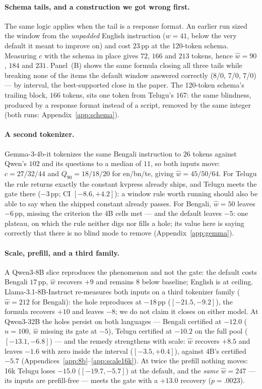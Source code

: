 \documentclass{article}
\begin{document}
\paragraph{Schema tails, and a construction we got wrong first.}
The same logic applies when the tail is a response format. An
earlier run sized the window from the \emph{unpadded} English
instruction ($w{=}41$, below the very default it meant to improve on)
and cost $23$\,pp at the 120-token schema. Measuring $c$ with the
schema in place gives $72$, $166$ and $213$ tokens, hence
$\hat w = 90$, $184$ and $231$. Panel~(B) shows the same formula closing
all three tails while breaking none of the items the default window
answered correctly (8/0, 7/0, 7/0) --- by interval, the best-supported
close in the paper. The 120-token schema's
trailing block, $166$ tokens, sits one token from Telugu's $167$: the
same blindness, produced by a response format instead of a script,
removed by the same integer (both runs: Appendix~\ref{app:schema}).

\paragraph{A second tokenizer.}
Gemma-3-4b-it tokenizes the same Bengali instruction to $26$ tokens
against Qwen's $102$ and its questions to a median of $11$, so both
inputs move: $c{=}27/32/44$ and $Q_{90}{=}18/18/20$ for en/bn/te,
giving $\hat w = 45/50/64$.
For Telugu the rule returns exactly the constant kvpress already
ships, and Telugu meets the gate there ($-3$\,pp; CI $[-8.6, +4.2]$):
a window rule worth running should also be able to say when the
shipped constant already passes. For Bengali, $\hat w{=}50$ leaves $-6$\,pp,
missing the criterion the 4B cells met --- and the default leaves
$-5$: one plateau, on which the rule neither digs nor fills a hole;
its value here is saying correctly that there is no blind mode to
remove (Appendix~\ref{app:gemma}).

\paragraph{Scale, prefill, and a third family.}
A Qwen3-8B slice reproduces the phenomenon and not the gate: the
default costs Bengali $17$\,pp, $\hat w$ recovers $+9$ and remains
$8$ below baseline; English is at ceiling. Llama-3.1-8B-Instruct re-measures both
inputs on a third tokenizer family ($\hat w{=}212$ for Bengali): the
hole reproduces at $-18$\,pp ($[-21.5,-9.2]$), the formula recovers
$+10$ and leaves $-8$; we do not claim it closes on either model. At Qwen3-32B the holes persist on both
languages --- Bengali certified at $-12.0$ ($n{=}100$, $\hat w$
missing its gate at $-5$), Telugu certified at $-10.2$ on the full
pool ($[-13.1,-6.8]$) --- and the remedy strengthens with scale:
$\hat w$ recovers $+8.5$ and leaves $-1.6$ with zero inside the
interval ($[-3.5,+0.4]$), against 4B's certified $-5.7$
(Appendices~\ref{app:8b}--\ref{app:scale16k}). At twice the prefill nothing moves:
16k Telugu loses $-15.0$ ($[-19.7,-5.7]$) at the default, and the
\emph{same} $\hat w{=}247$ --- its inputs are prefill-free --- meets the
gate with a $+13.0$ recovery ($p{=}.0023$).
\end{document}

